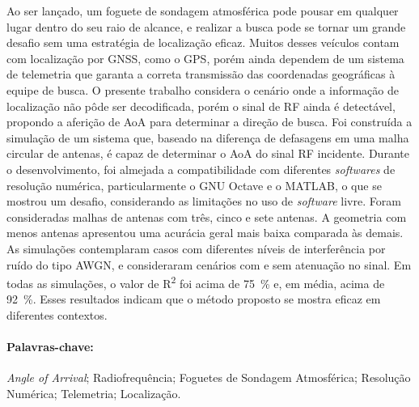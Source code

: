 % 

Ao ser lançado, um foguete de sondagem atmosférica pode pousar em qualquer lugar dentro do seu raio de alcance, e realizar a busca pode se tornar um grande desafio sem uma estratégia de localização eficaz.
Muitos desses veículos contam com localização por \acs{GNSS}, como o \acs{GPS}, porém ainda dependem de um sistema de telemetria que garanta a correta transmissão das coordenadas geográficas à equipe de busca.
O presente trabalho considera o cenário onde a informação de localização não pôde ser decodificada, porém o sinal de \acs{RF} ainda é detectável, propondo a aferição de \acf{AoA} para determinar a direção de busca.
Foi construída a simulação de um sistema que, baseado na diferença de defasagens em uma malha circular de antenas, é capaz de determinar o \acs{AoA} do sinal \acs{RF} incidente.
Durante o desenvolvimento, foi almejada a compatibilidade com diferentes \textit{softwares} de resolução numérica, particularmente o GNU Octave e o MATLAB, o que se mostrou um desafio, considerando as limitações no uso de \textit{software} livre.
Foram consideradas malhas de antenas com três, cinco e sete antenas.
A geometria com menos antenas apresentou uma acurácia geral mais baixa comparada às demais.
As simulações contemplaram casos com diferentes níveis de interferência por ruído do tipo \acs{AWGN}, e consideraram cenários com e sem atenuação no sinal.
Em todas as simulações, o valor de R\textsuperscript{2} foi acima de \qty{75}{\percent} e, em média, acima de \qty{92}{\percent}.
Esses resultados indicam que o método proposto se mostra eficaz em diferentes contextos.

\paragraph*{Palavras-chave:} \textit{Angle of Arrival}; Radiofrequência; Foguetes de Sondagem Atmosférica; Resolução Numérica; Telemetria; Localização.

